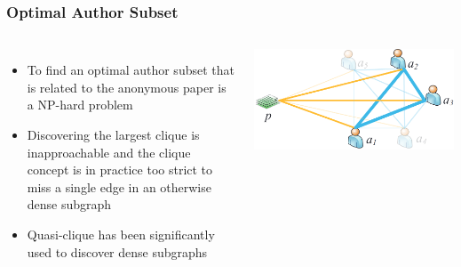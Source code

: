 \begin{frame}
\frametitle{Optimal Author Subset}
\begin{columns}

\begin{itemize}
    \item To find an optimal author subset that is related to the anonymous paper is a NP-hard problem
    \item Discovering the largest clique is inapproachable and the clique concept is in practice too strict to miss a single edge in an otherwise dense subgraph
    \item Quasi-clique has been significantly used to discover dense subgraphs
\end{itemize}

\includegraphics[width=1\linewidth]{img/paper-ego-solved}


\end{columns}
\end{frame}
